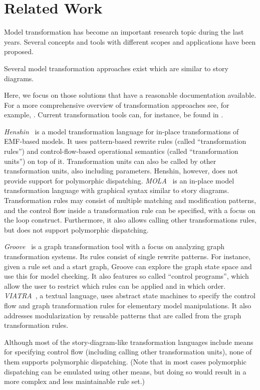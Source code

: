 \chapter{Related Work}

Model transformation has become an important research topic during the last years.
Several concepts and tools with different scopes and applications have been proposed.

Several model transformation approaches exist which are similar to story diagrams.

Here, we focus on those solutions that have a reasonable documentation available.
For a more comprehensive overview of transformation approaches see, for example, \cite{Czarnecki06}.
Current transformation tools can, for instance, be found in \cite{TTC2010}.

\emph{Henshin}~\cite{henshin2} is a model transformation language for in-place transformations of EMF-based models.
It uses pattern-based rewrite rules (called ``transformation rules'') and control-flow-based operational semantics (called ``transformation units'') on top of it.
Transformation units can also be called by other transformation units, also including parameters.
Henshin, however, does not provide support for polymorphic dispatching.
\emph{MOLA}~\cite{mola} is an in-place model transformation language with graphical syntax similar to story diagrams.
Transformation rules may consist of multiple matching and modification patterns, and the control flow inside a transformation rule can be specified, with a focus on the loop construct.  
Furthermore, it also allows calling other transformations rules, but does not support polymorphic dispatching.

\emph{Groove}~\cite{Ren04a}  is a graph transformation tool with a focus on analyzing graph transformation systems.
Its rules consist of single rewrite patterns.
For instance, given a rule set and a start graph, Groove can explore the graph state space and use this for model checking.
It also features so called ``control programs'', which allow the user to restrict which rules can be applied and in which order.
\emph{VIATRA}~\cite{viatra}, a textual language, uses abstract state machines to specify the control flow and graph transformation rules for elementary model manipulations.
It also addresses modularization by reusable patterns that are called from the graph transformation rules. 

Although most of the story-diagram-like transformation languages include means for specifying control flow (including calling other transformation units), none of them supports polymorphic dispatching.
(Note that in most cases polymorphic dispatching can be emulated using other means, but doing so would result in a more complex and less maintainable rule set.)

